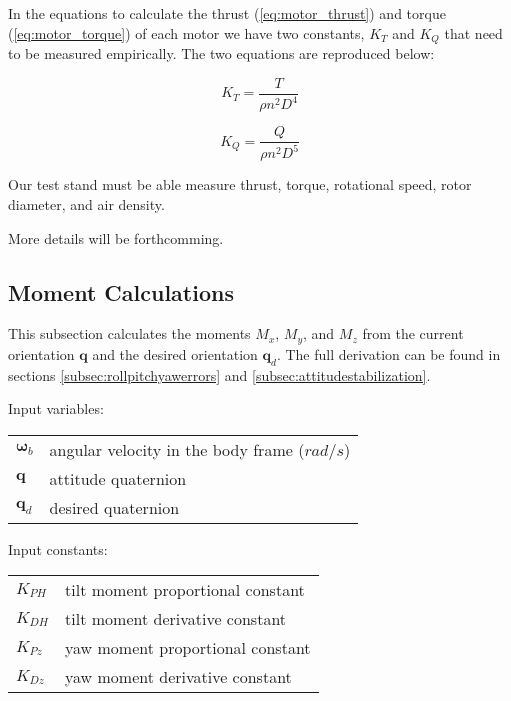 \documentclass{article}
\numberwithin{equation}{section} %
\newcommand{\bs}[1]{\boldsymbol{#1}}
\begin{document}
In the equations to calculate the thrust (\ref{eq:motor_thrust}) and torque (\ref{eq:motor_torque}) of each motor we have two constants, $K_T$ and $K_Q$ that need to be measured empirically. The two equations are reproduced below:

\begin{equation} %
K_T = \frac{T}{\rho n^2 D^4}
\end{equation}

\begin{equation} %
K_Q = \frac{Q}{\rho n^2 D^5}
\end{equation}

Our test stand must be able measure thrust, torque, rotational speed, rotor diameter, and air density.

More details will be forthcomming.

\subsection{Moment Calculations} \label{subsec:momentcalculations}
This subsection calculates the moments $M_x$, $M_y$, and $M_z$ from the current orientation $\bs{q}$ and the desired orientation $\bs{q}_d$. The full derivation can be found in sections \ref{subsec:rollpitchyawerrors} and \ref{subsec:attitudestabilization}.


\bigskip

Input variables:
\begin{tabular}{l l}
 	$ \bs{\omega}_{b} $ 	& angular velocity in the body frame ($rad/s$) \\
 	$ \mathbf{q} $ 			& attitude quaternion \\
 	$ \mathbf{q}_d $		& desired quaternion \\
\end{tabular}

\bigskip

Input constants:
\begin{tabular}{l l}
 	$K_{PH} $				& tilt moment proportional constant \\
 	$K_{DH} $				& tilt moment derivative constant \\
 	$K_{Pz} $				& yaw moment proportional constant \\
 	$K_{Dz} $				& yaw moment derivative constant \\ 	
\end{tabular}
\end{document}

